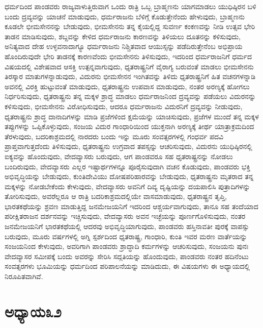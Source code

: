 ಧರ್ಮದಿಂದ ಪಾಂಡವರು ರಾಜ್ಯವಾಳುತ್ತಿರುವಾಗ ಒಂದು ರಾತ್ರಿ ಒಬ್ಬ ಬ್ರಾಹ್ಮಣನು ಯಾಗಮಾಡಲು ಯುಧಿಷ್ಠಿರನ ಬಳಿ ಬಂದು ದ್ರವ್ಯವನ್ನು ಯಾಚನೆ ಮಾಡುವುದು, ಧರ್ಮರಾಜನು ಬೆಳಿಗ್ಗೆ ಕೊಡುತ್ತೇನೆಂದು ಹೇಳುವುದು, ಬ್ರಾಹ್ಮಣನು ಕೂಡಲೇ ಭೀಮಸೇನನನ್ನು ಬೇಡುವುದು, ಭೀಮಸೇನನು ತನ್ನ ಕೈಯಲ್ಲಿದ್ದ ಸುವರ್ಣ ಕಂಕಣವನ್ನು ನೀಡಿ ಉತ್ಸವ ಭೇರಿ ತಾಡನ ಮಾಡಿಸುವುದು, ಶಬ್ದವನ್ನು ಕೇಳಿದ ಧರ್ಮರಾಜನು ಕಾರಣವನ್ನು ತಿಳಿಯಲು ದೂತನನ್ನು ಕಳಿಸುವುದು, ಅನಿತ್ಯವಾದ ದೇಹ ಉಳ್ಳವನಾದಾಗ್ಯೂ ಧರ್ಮರಾಜನು ನಿಶ್ಚಿತವಾದ ಆಯುಸ್ಸನ್ನು ಪಡೆದಿರುತ್ತೇನೆಂಬ ಅಭಿಪ್ರಾಯ ಹೊಂದಿರುವುದೇ ಭೇರಿ ತಾಡನಕ್ಕೆ ಕಾರಣವೆಂದು ಭೀಮಸೇನನು ತಿಳಿಸುವುದು, ಇದರಿಂದ ಧರ್ಮರಾಜನಿಗೆ ಧರ್ಮದ ವಿಷಯದಲ್ಲಿ ವಿಶೇಷವಾದ ಆಸಕ್ತಿ ಉತ್ಪನ್ನವಾಗುವುದು, ಧೃತರಾಷ್ಟ್ರನಿಗೆ ವೈರಾಗ್ಯ ಬರುವಂತೆ ಮಾಡಲು ಭೀಮಸೇನನು ತಿರಸ್ಕಾರ ಮಾತುಗಳನ್ನಾಡುವುದು, ವಿದುರನು ಭೀಮಸೇನನ ಇಂಗಿತವನ್ನು ತಿಳಿದು ಧೃತರಾಷ್ಟ್ರನಿಗೆ ಹಿತ ವಚನಗಳನ್ನಾಡಿ ಅವನಲ್ಲಿ ವಿರಕ್ತಿ ಹುಟ್ಟುವಂತೆ ಮಾಡುವುದು, ಧೃತರಾಷ್ಟ್ರನು ಉಪವಾಸ ಮಾಡುವುದು, ನಂತರ ಅರಣ್ಯಕ್ಕೆ ಹೋಗಲು ನಿರ್ಧರಿಸುವುದು, ಧೃತರಾಷ್ಟ್ರನು ತನ್ನ ಮಕ್ಕಳ ಶ್ರಾದ್ಧ ಮಾಡಲು ಧರ್ಮರಾಜನಿಂದ ದ್ರವ್ಯವನ್ನು ಪಡೆಯಲು ವಿದುರನನ್ನು ಕಳಿಸುವುದು, ಭೀಮಸೇನನು ವಿರೋಧಿಸುವುದು, ಆದರೂ ಧರ್ಮರಾಜನು ವಿದುರನಿಗೆ ದ್ರವ್ಯವನ್ನು ನೀಡುವುದು, ಧೃತರಾಷ್ಟ್ರನು ಶ್ರಾದ್ಧ ದಾನಾದಿಗಳನ್ನು ಮಾಡಿ ಪ್ರಜೆಗಳಿಂದ ಕ್ಷಮೆಯನ್ನು ಯಾಚಿಸುವುದು, ಪ್ರಜೆಗಳ ಮುಂದೆ ತನ್ನ ಮಕ್ಕಳ ತಪ್ಪುಗಳನ್ನು ಒಪ್ಪಿಕೊಳ್ಳುವುದು, ಸಂಜಯ ವಿದುರ ಗಾಂಧಾರಿಯಿಂದ ಯುಕ್ತನಾಗಿ ಅರಣ್ಯಕ್ಕೆ ತೀರ್ಥ ಯಾತ್ರಾಕ್ರಮದಿಂದ ತೆರಳುವುದು, ಬದರಿಕಾಶ್ರಮದಲ್ಲಿ ನಾರದರು ಬಂದು ಇನ್ನು ಮೂರು ಸಂವತ್ಸರಗಳಲ್ಲಿ ಗಂಧರ್ವ ಪದವಿ ಪ್ರಾಪ್ತವಾಗುತ್ತದೆಂದು ತಿಳಿಸುವುದು, ಧೃತರಾಷ್ಟ್ರನು ಉಗ್ರವಾದ ತಪಸ್ಸನ್ನು ಆಚರಿಸುವುದು, ವಿದುರನು ಯುಧಿಷ್ಠಿರನಲ್ಲಿ ಐಕ್ಯವನ್ನು ಹೊಂದುವುದು, ವೇದವ್ಯಾಸರು ಬರುವುದು, ಆಗ ಪಾಂಡವರೂ ಸಹ ಧೃತರಾಷ್ಟ್ರನನ್ನು ನೋಡಲು ಬಂದಿರುವುದು, ವೇದವ್ಯಾಸರು ಎಲ್ಲರ ಇಷ್ಟಾರ್ಥಗಳನ್ನೂ ಪೂರೈಸುವುದಾಗಿ ವಚನ ಕೊಡುವುದು, ಪಾಂಡವರು ಭಕ್ತಿ ಅಭಿವೃದ್ಧಿಯನ್ನು ಬೇಡುವುದು, ಕುಂತಿದೇವಿಯು ದೋಷಪರಿಹಾರವನ್ನು ಬೇಡುವುದು, ಧೃತರಾಷ್ಟ್ರನು ಮೃತರಾದ ತನ್ನ ಮಕ್ಕಳನ್ನು ನೋಡಬೇಕೆಂದು ಕೇಳುವುದು, ವೇದವ್ಯಾಸರು ಅವನಿಗೆ ದಿವ್ಯ ದೃಷ್ಟಿಯನ್ನು ದಯಪಾಲಿಸಿ ಪುತ್ರಾದಿಗಳನ್ನು ತೋರಿಸುವುದು, ಅವರೆಲ್ಲರೂ ಆ ರಾತ್ರಿ ಬದರಿಕಾಶ್ರಮದಲ್ಲಿಯೇ ವಾಸಮಾಡುವುದು, ಧೃತರಾಷ್ಟ್ರನ ತೃಪ್ತಿ, ಭಾರತಕಥೆಯನ್ನು ಶ್ರವಣ ಮಾಡುತ್ತಿದ್ದ ಜನಮೇಜಯನಿಗೆ ಇದರಿಂದ ಆಶ್ಚರ್ಯವಾಗುವುದು, ತಾನೂ ಸಹ ತಂದೆಯಾದ ಪರೀಕ್ಷಿತರಾಜನ ದರ್ಶನವನ್ನು ಇಚ್ಚಿಸುವುದು, ವೇದವ್ಯಾಸರು ಅವನ ಇಚ್ಛೆಯನ್ನು ಪೂರ್ಣಗೊಳಿಸುವುದು, ನಂತರ ಜನಮೇಜಯನಿಗೆ ಭಾರತಕಥೆಯಲ್ಲಿ ಆದರವು ಅಭಿವೃದ್ಧಿಯಾಗುವುದು, ಪಾಂಡವರು ಹಸ್ತಿನಾವತೀ ಪುರಕ್ಕೆ ವಾಪಸ್ಸು ಬರುವುದು, ಮೂರು ವರ್ಷಗಳಲ್ಲಿ ಅಗ್ನಿ ಸ್ಪರ್ಶದಿಂದ ಧೃತರಾಷ್ಟ್ರ, ಗಾಂಧಾರಿ, ಕುಂತಿ ಇವರ ಮರಣ ವಾರ್ತೆಯನ್ನು ಸಂಜಯನಿಂದ ಕೇಳುವುದು, ಅವರಿಗಾಗಿ ಪಾಂಡವರು ಶ್ರಾದ್ಧಾದಿ ಕರ್ಮಗಳನ್ನು ಆಚರಿಸುವುದು, ಸಂಜಯನು ಪುನಃ ವೇದವ್ಯಾಸರ ಸಮೀಪಕ್ಕೆ ಬಂದು ಅವರನ್ನು ಸೇರಿಸಿ ಸದ್ಗತಿಯನ್ನು ಹೊಂದುವುದು, ಪಾಂಡವರು ನಂತರ ಹದಿನೆಂಟು ಸಂವತ್ಸರಗಳು ಭೂಮಿಯನ್ನು ಧರ್ಮದಿಂದ ಪರಿಪಾಲನೆಯನ್ನು ಮಾಡಿದುದು, ಈ ವಿಷಯಗಳು ಈ ಅಧ್ಯಾಯದಲ್ಲಿ ನಿರೂಪಿತವಾಗಿವೆ.


\section*{ಅಧ್ಯಾಯ\enginline{-}೩೨}

